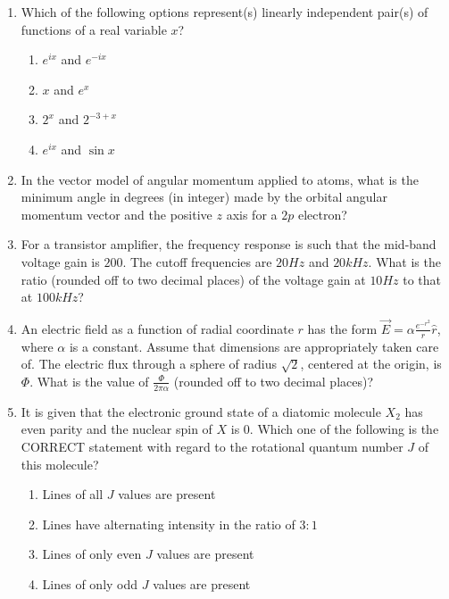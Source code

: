 \documentclass[journal,12pt,onecolumn]{IEEEtran}
\theoremstyle{remark}
\begin{document}
\begin{enumerate}
\item Which of the following options represent(s) linearly independent pair(s) of functions of a real variable $x$?

\begin{enumerate}
    \item $e^{ix}$ and $e^{-ix}$
    \item  $x$ and $e^{x}$
    \item $2^{x}$ and $2^{- 3 + x}$
    \item $e^{ix}$ and $\sin x$
\end{enumerate}

\item In the vector model of angular momentum applied to atoms, what is the minimum angle in degrees (in integer) made by the orbital angular momentum vector and the positive $z$ axis for a $2p$ electron?

\item For a transistor amplifier, the frequency response is such that the mid-band voltage gain is $200$. The cutoff frequencies are $20 Hz$ and $20 kHz$. What is the ratio (rounded off to two decimal places) of the voltage gain at $10 Hz$ to that at $100 kHz$?

\item An electric field as a function of radial coordinate $r$ has the form $\overrightarrow{E} = \alpha \frac{e^{-r^{2}}}{r} \hat{r}$, where $\alpha$ is a constant. Assume that dimensions are appropriately taken care of. The electric flux through a sphere of radius $\sqrt{2}$, centered at the origin, is $\Phi$. What is the value of $\frac{\Phi}{2\pi \alpha}$ (rounded off to two decimal places)?

\item It is given that the electronic ground state of a diatomic molecule $X_2$ has even parity and the nuclear spin of $X$ is $0$. Which one of the following is the CORRECT statement with regard to the rotational quantum number $J$ of this molecule?

\begin{enumerate}
    \item Lines of all $J$ values are present
    \item Lines have alternating intensity in the ratio of $3:1$
    \item Lines of only even $J$ values are present
    \item Lines of only odd $J$ values are present
\end{enumerate}



\end{enumerate}
\end{document}
